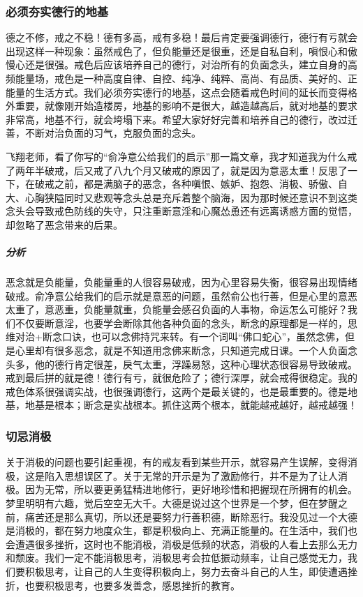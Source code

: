 \subsubsection{必须夯实德行的地基}

德之不修，戒之不稳！德有多高，戒有多稳！最后肯定要强调德行，德行有亏就会出现这样一种现象：虽然戒色了，但负能量还是很重，还是自私自利，嗔恨心和傲慢心还是很强。戒色后应该培养自己的德行，对治所有的负面念头，建立自身的高频能量场，戒色是一种高度自律、自控、纯净、纯粹、高尚、有品质、美好的、正能量的生活方式。我们必须夯实德行的地基，这点会随着戒色时间的延长而变得格外重要，就像刚开始造楼房，地基的影响不是很大，越造越高后，就对地基的要求非常高，地基不行，就会垮塌下来。希望大家好好完善和培养自己的德行，改过迁善，不断对治负面的习气，克服负面的念头。

\begin{case}
    飞翔老师，看了你写的“俞净意公给我们的启示”那一篇文章，我才知道我为什么戒了两年半破戒，后又戒了八九个月又破戒的原因了，就是因为意恶太重！反思了一下，在破戒之前，都是满脑子的恶念，各种嗔恨、嫉妒、抱怨、消极、骄傲、自大、心胸狭隘同时又悲观等念头总是充斥着整个脑海，因为那时候还意识不到这类念头会导致戒色防线的失守，只注重断意淫和心魔怂恿还有远离诱惑方面的觉悟，却忽略了恶念带来的后果。
    \subparagraph{分析} 恶念就是负能量，负能量重的人很容易破戒，因为心里容易失衡，很容易出现情绪破戒。俞净意公给我们的启示就是意恶的问题，虽然俞公也行善，但是心里的意恶太重了，意恶重，负能量就重，负能量会感召负面的人事物，命运怎么可能好？我们不仅要断意淫，也要学会断除其他各种负面的念头，断念的原理都是一样的，思维对治+断念口诀，也可以念佛持咒来转。有一个词叫“佛口蛇心”，虽然念佛，但是心里却有很多恶念，就是不知道用念佛来断念，只知道完成日课。一个人负面念头多，他的德行肯定很差，戾气太重，浮躁易怒，这种心理状态很容易导致破戒。戒到最后拼的就是德！德行有亏，就很危险了；德行深厚，就会戒得很稳定。我的戒色体系很强调实战，也很强调德行，这两个是最关键的，也是最重要的。德是地基，地基是根本；断念是实战根本。抓住这两个根本，就能越戒越好，越戒越强！
\end{case}

\subsubsection{切忌消极}

关于消极的问题也要引起重视，有的戒友看到某些开示，就容易产生误解，变得消极，这是陷入思想误区了。关于无常的开示是为了激励修行，并不是为了让人消极。因为无常，所以要更勇猛精进地修行，更好地珍惜和把握现在所拥有的机会。梦里明明有六趣，觉后空空无大千。大德是说过这个世界是一个梦，但在梦醒之前，痛苦还是那么真切，所以还是要努力行善积德，断除恶行。我没见过一个大德是消极的，都在努力地度众生，都是积极向上、充满正能量的。在生活中，我们也会遭遇很多挫折，这时也不能消极，消极是低频的状态，消极的人看上去那么无力和颓废。我们一定不能消极思考，消极思考会拉低振动频率，让自己感觉无力，我们要积极思考，让自己的人生变得积极向上，努力去奋斗自己的人生，即使遭遇挫折，也要积极思考，也要多发善念，感恩挫折的教育。

